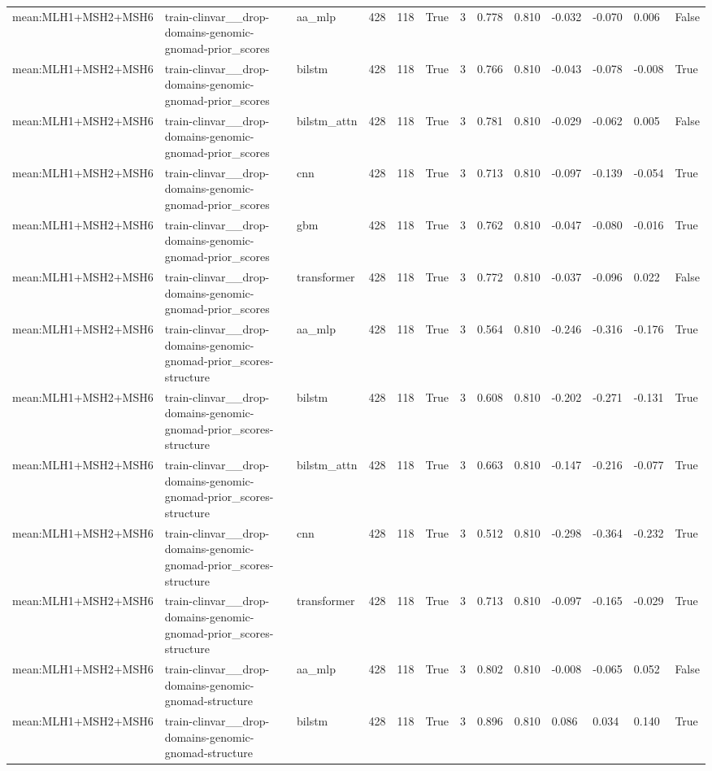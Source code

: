 \begin{table}[t]
\begin{tabular}{lllllllllllll}
mean:MLH1+MSH2+MSH6 & train-clinvar\_\_drop-domains-genomic-gnomad-prior\_scores & aa\_mlp & 428 & 118 & True & 3 & 0.778 & 0.810 & -0.032 & -0.070 & 0.006 & False \\
mean:MLH1+MSH2+MSH6 & train-clinvar\_\_drop-domains-genomic-gnomad-prior\_scores & bilstm & 428 & 118 & True & 3 & 0.766 & 0.810 & -0.043 & -0.078 & -0.008 & True \\
mean:MLH1+MSH2+MSH6 & train-clinvar\_\_drop-domains-genomic-gnomad-prior\_scores & bilstm\_attn & 428 & 118 & True & 3 & 0.781 & 0.810 & -0.029 & -0.062 & 0.005 & False \\
mean:MLH1+MSH2+MSH6 & train-clinvar\_\_drop-domains-genomic-gnomad-prior\_scores & cnn & 428 & 118 & True & 3 & 0.713 & 0.810 & -0.097 & -0.139 & -0.054 & True \\
mean:MLH1+MSH2+MSH6 & train-clinvar\_\_drop-domains-genomic-gnomad-prior\_scores & gbm & 428 & 118 & True & 3 & 0.762 & 0.810 & -0.047 & -0.080 & -0.016 & True \\
mean:MLH1+MSH2+MSH6 & train-clinvar\_\_drop-domains-genomic-gnomad-prior\_scores & transformer & 428 & 118 & True & 3 & 0.772 & 0.810 & -0.037 & -0.096 & 0.022 & False \\
mean:MLH1+MSH2+MSH6 & train-clinvar\_\_drop-domains-genomic-gnomad-prior\_scores-structure & aa\_mlp & 428 & 118 & True & 3 & 0.564 & 0.810 & -0.246 & -0.316 & -0.176 & True \\
mean:MLH1+MSH2+MSH6 & train-clinvar\_\_drop-domains-genomic-gnomad-prior\_scores-structure & bilstm & 428 & 118 & True & 3 & 0.608 & 0.810 & -0.202 & -0.271 & -0.131 & True \\
mean:MLH1+MSH2+MSH6 & train-clinvar\_\_drop-domains-genomic-gnomad-prior\_scores-structure & bilstm\_attn & 428 & 118 & True & 3 & 0.663 & 0.810 & -0.147 & -0.216 & -0.077 & True \\
mean:MLH1+MSH2+MSH6 & train-clinvar\_\_drop-domains-genomic-gnomad-prior\_scores-structure & cnn & 428 & 118 & True & 3 & 0.512 & 0.810 & -0.298 & -0.364 & -0.232 & True \\
mean:MLH1+MSH2+MSH6 & train-clinvar\_\_drop-domains-genomic-gnomad-prior\_scores-structure & transformer & 428 & 118 & True & 3 & 0.713 & 0.810 & -0.097 & -0.165 & -0.029 & True \\
mean:MLH1+MSH2+MSH6 & train-clinvar\_\_drop-domains-genomic-gnomad-structure & aa\_mlp & 428 & 118 & True & 3 & 0.802 & 0.810 & -0.008 & -0.065 & 0.052 & False \\
mean:MLH1+MSH2+MSH6 & train-clinvar\_\_drop-domains-genomic-gnomad-structure & bilstm & 428 & 118 & True & 3 & 0.896 & 0.810 & 0.086 & 0.034 & 0.140 & True \\

\end{tabular}
\end{table}
